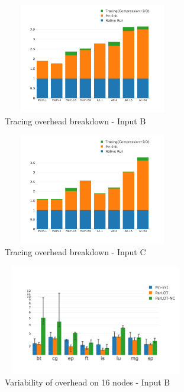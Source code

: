 



\begin{figure}[t]
\centering
\includegraphics[width=3.1in,height=1.9in]{parlot/figs.comet.newMed/comet_chartDet_B_wc_byTool_p3_5.png}
\caption{ Tracing overhead breakdown - Input B}
\label{comet_chartDet_B_wc_byTool_p3_5}
\end{figure}


\begin{figure}[t]
\centering
\includegraphics[width=3.1in,height=1.9in]{parlot/figs.comet.newMed/comet_chartDet_C_wc_byTool_p3_5.png}
\caption{ Tracing overhead breakdown - Input C}
\label{comet_chartDet_C_wc_byTool_p3_5}
\end{figure}



\begin{figure}[t]
\centering
\includegraphics[width=3.2in,height=1.9in]{parlot/figs.comet.newMed/comet_BX2_Main_16_B_p3_5.png}
\caption{ Variability of \parlotm overhead on 16 nodes - Input B}
\label{comet_BX2_Main_16_B_p3_5}
\end{figure}


